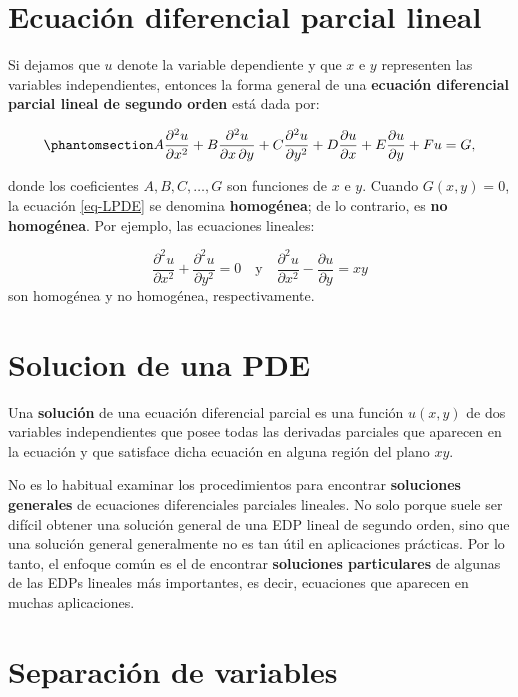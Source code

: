 \documentclass[
  spanish,
  us-letterpaper,
  DIV=11,
  numbers=noendperiod]{scrreprt}
\theoremstyle{definition}
\theoremstyle{plain}
\theoremstyle{remark}
\begin{document}
\section{Ecuación diferencial parcial
lineal}\label{ecuaciuxf3n-diferencial-parcial-lineal}

Si dejamos que \(u\) denote la variable dependiente y que \(x\) e \(y\)
representen las variables independientes, entonces la forma general de
una \textbf{ecuación diferencial parcial lineal de segundo orden} está
dada por:

\begin{equation}\phantomsection\label{eq-LPDE}{
A \dfrac{\partial^2 u}{\partial x^2} + B \dfrac{\partial^2 u}{\partial x \, \partial y} + C \dfrac{\partial^2 u}{\partial y^2} + D \dfrac{\partial u}{\partial x} + E \dfrac{\partial u}{\partial y} + F u = G,
}\end{equation}

donde los coeficientes \(A, B, C, \dots, G\) son funciones de \(x\) e
\(y\). Cuando \(G(x, y) = 0\), la ecuación \ref{eq-LPDE} se denomina
\textbf{homogénea}; de lo contrario, es \textbf{no homogénea}. Por
ejemplo, las ecuaciones lineales:

\[
\dfrac{\partial^2 u}{\partial x^2} + \dfrac{\partial^2 u}{\partial y^2} = 0 \quad\text{y} \quad \dfrac{\partial^2 u}{\partial x^2} - \dfrac{\partial u}{\partial y} = x y
\] son homogénea y no homogénea, respectivamente.

\section{Solucion de una PDE}\label{solucion-de-una-pde}

Una \textbf{solución} de una ecuación diferencial parcial es una función
\(u(x, y)\) de dos variables independientes que posee todas las
derivadas parciales que aparecen en la ecuación y que satisface dicha
ecuación en alguna región del plano \(xy\).

No es lo habitual examinar los procedimientos para encontrar
\textbf{soluciones generales} de ecuaciones diferenciales parciales
lineales. No solo porque suele ser difícil obtener una solución general
de una EDP lineal de segundo orden, sino que una solución general
generalmente no es tan útil en aplicaciones prácticas. Por lo tanto, el
enfoque común es el de encontrar \textbf{soluciones particulares} de
algunas de las EDPs lineales más importantes, es decir, ecuaciones que
aparecen en muchas aplicaciones.

\section{Separación de variables}\label{separaciuxf3n-de-variables}
\end{document}
